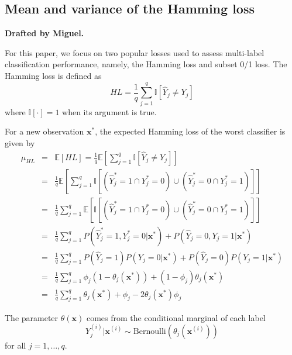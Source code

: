 \documentclass[review]{elsarticle}
\begin{document}
\subsection{Mean and variance of the Hamming loss}\label{ss:Hamming}

{\bf Drafted by Miguel.}

For this paper, we focus on two popular losses used to assess multi-label classification performance, namely, the Hamming loss and subset 0/1 loss. The Hamming loss is defined as
\begin{equation}
HL = \frac{1}{q} \sum^{q}_{j=1}{\mathbb{I} [\hat{Y}_{j} \neq Y_{j}]}
\end{equation}
where $\mathbb{I}[\cdot] = 1$ when its argument is true.

For a new observation $\mathbf{x}^{*}$, the expected Hamming loss of the worst classifier is given by
\begin{eqnarray*}
\mu_{HL} &=& \mathbb{E}[HL] = \frac{1}{q} \mathbb{E} \left[ \sum^{q}_{j=1}{\mathbb{I} [\hat{Y}_{j} \neq Y_{j}]} \right] \\
&=& \frac{1}{q} \mathbb{E} \left[ \sum^{q}_{j=1}{\mathbb{I} [(\hat{Y}^{*}_{j} = 1 \cap Y^{*}_{j} = 0) \cup (\hat{Y}^{*}_{j} = 0 \cap Y^{*}_{j} = 1) ]} \right] \\
&=& \frac{1}{q} \sum^{q}_{j=1}{\mathbb{E} \left[ \mathbb{I} [(\hat{Y}^{*}_{j} = 1 \cap Y^{*}_{j} = 0) \cup (\hat{Y}^{*}_{j} = 0 \cap Y^{*}_{j} = 1) ] \right]} \\
&=& \frac{1}{q} \sum^{q}_{j=1}{P(\hat{Y}^{*}_{j}=1,Y^{*}_{j}=0|\mathbf{x}^{*}) + P(\hat{Y}_{j}=0,Y_{j}=1|\mathbf{x}^{*})} \\
& = & \frac{1}{q} \sum^{q}_{j=1}{P(\hat{Y}_{j}=1)P(Y_{j}=0|\mathbf{x}^{*}) + P(\hat{Y}_{j}=0)P(Y_{j}=1|\mathbf{x}^{*})}  \\
&=& \frac{1}{q} \sum^{q}_{j=1} \phi_{j} (1 - \theta_{j}(\mathbf{x}^{*})) + (1 - \phi_{j})\theta_{j}(\mathbf{x}^{*}) \\
&=&  \frac{1}{q} \sum^{q}_{j=1}{\theta_{j}(\mathbf{x}^{*}) + \phi_{j} - 2 \theta_{j}(\mathbf{x}^{*}) \phi_{j}}
\end{eqnarray*}

The parameter $\theta(\mathbf{x})$ comes from the conditional marginal of each label
\begin{equation}
Y^{(i)}_{j}| \mathbf{x}^{(i)} \sim \mathrm{Bernoulli}(\theta_{j}(\mathbf{x}^{(i)}))
\end{equation}
for all $j = 1,\ldots,q$.
\end{document}
